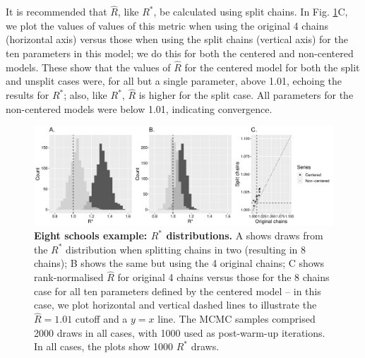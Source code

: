 \documentclass{article}
\begin{document}
It is recommended that $\widehat{R}$, like $R^*$, be calculated using split chains. In Fig. \ref{fig:eight_schools}C, we plot the values of values of this metric when using the original 4 chains (horizontal axis) versus those when using the split chains (vertical axis) for the ten parameters in this model; we do this for both the centered and non-centered models. These show that the values of $\widehat{R}$ for the centered model for both the split and unsplit cases were, for all but a single parameter, above 1.01, echoing the results for $R^*$; also, like $R^*$, $\widehat{R}$ is higher for the split case. All parameters for the non-centered models were below 1.01, indicating convergence.

\begin{figure}[!htb]
	\centerline{\includegraphics[width=1.0\textwidth]{../output/eight_schools.pdf}}
	\caption{\textbf{Eight schools example: $R^*$ distributions.} A shows draws from the $R^*$ distribution when splitting chains in two (resulting in 8 chains); B shows the same but using the 4 original chains; C shows rank-normalised $\widehat{R}$ for original 4 chains versus those for the 8 chains case for all ten parameters defined by the centered model -- in this case, we plot horizontal and vertical dashed lines to illustrate the $\widehat{R}=1.01$ cutoff and a $y=x$ line. The MCMC samples comprised 2000 draws in all cases, with 1000 used as post-warm-up iterations. In all cases, the plots show 1000 $R^*$ draws.}
	\label{fig:eight_schools}
\end{figure}
\end{document}
